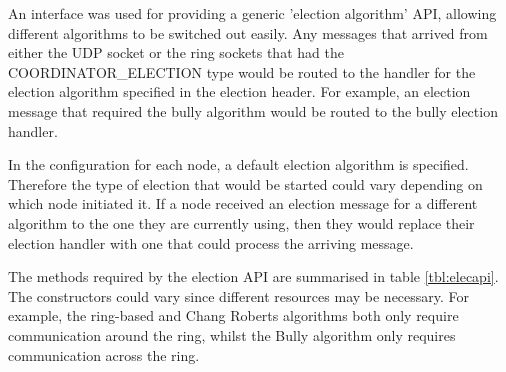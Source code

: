 \documentclass[12pt]{article}
\begin{document}
An interface was used for providing a generic 'election algorithm' API, allowing different algorithms to be switched out easily. Any messages that arrived from either the UDP socket or the ring sockets that had the COORDINATOR\_ELECTION type would be routed to the handler for the election algorithm specified in the election header. For example, an election message that required the bully algorithm would be routed to the bully election handler.

In the configuration for each node, a default election algorithm is specified. Therefore the type of election that would be started could vary depending on which node initiated it. If a node received an election message for a different algorithm to the one they are currently using, then they would replace their election handler with one that could process the arriving message. 

The methods required by the election API are summarised in table \ref{tbl:elecapi}. The constructors could vary since different resources may be necessary. For example, the ring-based and Chang Roberts algorithms both only require communication around the ring, whilst the Bully algorithm only requires communication across the ring.

\begin{table}[!ht]
\centering
{}
\caption{Methods of the election handler interface.}
\label{tbl:elecapi}
\end{table}
\end{document}
